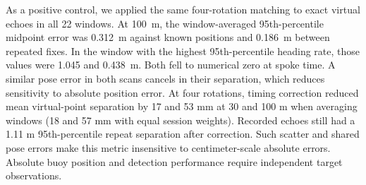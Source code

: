 As a positive control, we applied the same four-rotation matching to exact virtual echoes in all 22 windows. At 100~m, the window-averaged 95th-percentile midpoint error was 0.312~m against known positions and 0.186~m between repeated fixes. In the window with the highest 95th-percentile heading rate, those values were 1.045 and 0.438~m. Both fell to numerical zero at spoke time. A similar pose error in both scans cancels in their separation, which reduces sensitivity to absolute position error. At four rotations, timing correction reduced mean virtual-point separation by 17 and 53 mm at 30 and 100 m when averaging windows (18 and 57 mm with equal session weights). Recorded echoes still had a 1.11 m 95th-percentile repeat separation after correction. Such scatter and shared pose errors make this metric insensitive to centimeter-scale absolute errors. Absolute buoy position and detection performance require independent target observations.

